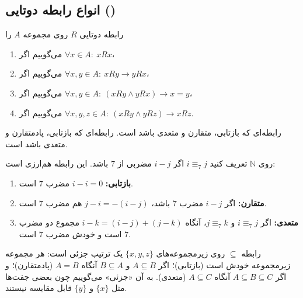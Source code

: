 \subsection{انواع رابطه دوتایی ()}
رابطه دوتایی $R$ روی مجموعه $A$ را
\begin{enumerate}
\item {} می‌گوییم اگر $\forall x\in A:\ xRx$،
\item {} می‌گوییم اگر $\forall x,y\in A:\ xRy\rightarrow yRx$،
\item {} می‌گوییم اگر $\forall x,y\in A:\ (xRy \wedge yRx)\rightarrow x=y$،
\item {} می‌گوییم اگر $\forall x,y,z\in A:\ (xRy\wedge yRz)\rightarrow xRz$.
\end{enumerate}

\begin{definition}
رابطه‌ای که بازتابی، متقارن و متعدی باشد  است. رابطه‌ای که بازتابی، پادمتقارن و متعدی باشد  است.
\end{definition}

\begin{example}
روی $\mathbb{N}$ تعریف کنید $i\equiv_7 j$ اگر $i-j$ مضربی از $7$ باشد. این رابطه هم‌ارزی است:
\begin{enumerate}
\item \textbf{بازتابی:} $i-i=0$ مضرب $7$ است.
\item \textbf{متقارن:} اگر $i-j$ مضرب $7$ باشد، $j-i=-(i-j)$ هم مضرب $7$ است.
\item \textbf{متعدی:} اگر $i\equiv_7 j$ و $j\equiv_7 k$، آنگاه $i-k=(i-j)+(j-k)$ مجموع دو مضرب $7$ است و خودش مضرب $7$ است.
\end{enumerate}
\end{example}

\begin{example}
رابطه $\subseteq$ روی زیرمجموعه‌های $\{x,y,z\}$ یک ترتیب جزئی است: هر مجموعه زیرمجموعه خودش است (بازتابی)؛ اگر $A\subseteq B$ و $B\subseteq A$ آنگاه $A=B$ (پادمتقارن)؛ و اگر $A\subseteq B\subseteq C$ آنگاه $A\subseteq C$ (متعدی). به آن «جزئی» می‌گوییم چون بعضی جفت‌ها مثل $\{x\}$ و $\{y\}$ قابل مقایسه نیستند.
\begin{ltrfig}
\end{ltrfig}
\end{example}

